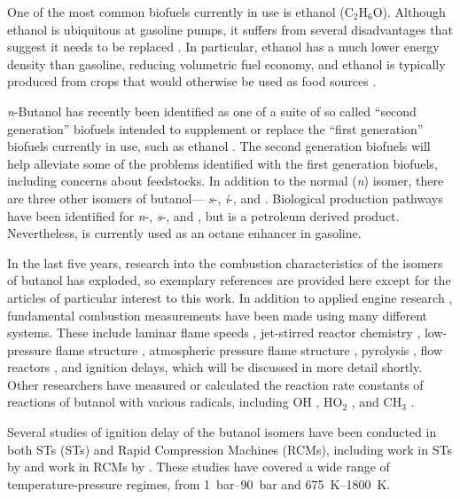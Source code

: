 \documentclass[../main.tex]{subfiles}
\begin{document}
One of the most common biofuels currently in use is ethanol (C$_2$H$_6$O).
Although ethanol is ubiquitous at gasoline pumps, it suffers from several
disadvantages that suggest it needs to be replaced \cite{Niven2005}. In particular, ethanol
has a much lower energy density than gasoline, reducing volumetric fuel
economy, and ethanol is typically produced from crops that would otherwise
be used as food sources \cite{Somma2009}.

\textit{n}-Butanol has recently been identified as one of a suite of so
called ``second generation'' biofuels intended to supplement or replace
the ``first generation'' biofuels currently in use, such as ethanol \cite{Harvey2011,Nigam2011}.
The second generation biofuels will help alleviate some of the problems
identified with the first generation biofuels, including concerns about
feedstocks. In addition to the normal (\textit{n}) isomer, there are three
other isomers of butanol--- \textit{s}-, \textit{i}-, and \tBuOH{}.
Biological production pathways have been identified for \textit{n}-, \textit{s}-,
and \iBuOH{} \cite{Nigam2011,Smith2010}, but \tBuOH{} is a petroleum derived product.
Nevertheless, \tBuOH{} is currently used as an octane enhancer in gasoline.

In the last five years, research into the combustion characteristics of
the isomers of butanol has exploded, so exemplary references are
provided here except for the articles of particular interest to this work.
In addition to applied engine research \cite{Dernotte2009, Szwaja2010, Kim2011},
fundamental combustion measurements have been made using many different
systems. These include laminar flame speeds \cite{Veloo2011a}, jet-stirred reactor
chemistry \cite{Dagaut2009}, low-pressure flame structure \cite{Hansen2011a,Hansen2013},
atmospheric pressure flame structure \cite{Grana2010}, pyrolysis \cite{VanGeem2010, Cai2012, Cai2013},
flow reactors \cite{Lefkowitz2012,Heyne2013}, and ignition delays, which will be discussed
in more detail shortly. Other researchers have measured or calculated the reaction
rate constants of reactions of butanol with various radicals, including OH \cite{Stranic2013a,
Pang2012, Pang2012a, Seal2013, Pang2012b, El-Nahas2012, Zhou2011, Moc2010, Vasu2010}, HO$_2$
\cite{Zhou2012, Alecu2012, Black2010a}, and CH$_3$ \cite{Katsikadakos2013, Katsikadakos2012}.

Several studies of ignition delay of the butanol isomers have been conducted
in both STs (STs) and Rapid Compression Machines (RCMs), including work in STs by \textcite{Moss2008,
Black2010, Noorani2010, Zhang2012, Stranic2012, Yasunaga2012, Heufer2011,
Vranckx2011, Zhu2014} and work in RCMs by \textcite{Weber2011,
Weber2013, Weber2013a, Karwat2011a}. These studies have covered a wide range of
temperature-pressure regimes, from \SIrange{1}{90}{\bar} and \SIrange{675}{1800}{\kelvin}.
\end{document}
